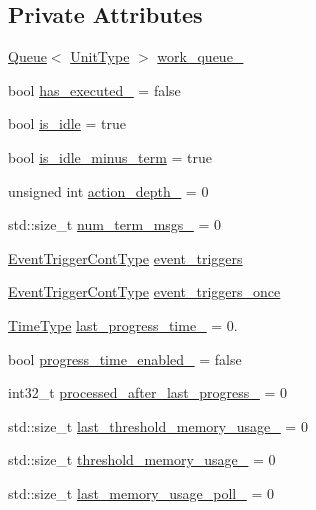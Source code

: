 \subsection*{Private Attributes}
\begin{DoxyCompactItemize}
\item 
\hyperlink{structvt_1_1sched_1_1_queue}{Queue}$<$ \hyperlink{structvt_1_1sched_1_1_scheduler_a398229f29b0940cea85aba4bae78b0be}{Unit\+Type} $>$ \hyperlink{structvt_1_1sched_1_1_scheduler_a8176bae441897c36b86e3fb917496a7a}{work\+\_\+queue\+\_\+}
\item 
bool \hyperlink{structvt_1_1sched_1_1_scheduler_ad67cd334d571ced5aa2ae2ffc6a8bec3}{has\+\_\+executed\+\_\+} = false
\item 
bool \hyperlink{structvt_1_1sched_1_1_scheduler_a99754f7b43db03bf0c67ae64d99c86ff}{is\+\_\+idle} = true
\item 
bool \hyperlink{structvt_1_1sched_1_1_scheduler_ad8e195a880684117d7cbb988488c36ef}{is\+\_\+idle\+\_\+minus\+\_\+term} = true
\item 
unsigned int \hyperlink{structvt_1_1sched_1_1_scheduler_a2cd57a3a421320e22d3ee8a6d47eb19e}{action\+\_\+depth\+\_\+} = 0
\item 
std\+::size\+\_\+t \hyperlink{structvt_1_1sched_1_1_scheduler_a4c70a87a9b15558a6ed628272a1db0fd}{num\+\_\+term\+\_\+msgs\+\_\+} = 0
\item 
\hyperlink{structvt_1_1sched_1_1_scheduler_a68203230dc48285d3d50bbb363ed267b}{Event\+Trigger\+Cont\+Type} \hyperlink{structvt_1_1sched_1_1_scheduler_a1f4ed72508099a9959a861f75e37f334}{event\+\_\+triggers}
\item 
\hyperlink{structvt_1_1sched_1_1_scheduler_a68203230dc48285d3d50bbb363ed267b}{Event\+Trigger\+Cont\+Type} \hyperlink{structvt_1_1sched_1_1_scheduler_a6bd19949bf8d905ea48f59ed544f6424}{event\+\_\+triggers\+\_\+once}
\item 
\hyperlink{namespacevt_a876a9d0cd5a952859c72de8a46881442}{Time\+Type} \hyperlink{structvt_1_1sched_1_1_scheduler_aba043e8bb57963e7a490376a06d0c96d}{last\+\_\+progress\+\_\+time\+\_\+} = 0.
\item 
bool \hyperlink{structvt_1_1sched_1_1_scheduler_a0eba67280dfcfb4d1e612e4cf15b8c4b}{progress\+\_\+time\+\_\+enabled\+\_\+} = false
\item 
int32\+\_\+t \hyperlink{structvt_1_1sched_1_1_scheduler_a826e82af9529a9f2dd087e4b8c14be9d}{processed\+\_\+after\+\_\+last\+\_\+progress\+\_\+} = 0
\item 
std\+::size\+\_\+t \hyperlink{structvt_1_1sched_1_1_scheduler_a49a7b0137e9096d9197d8a664eb28bf2}{last\+\_\+threshold\+\_\+memory\+\_\+usage\+\_\+} = 0
\item 
std\+::size\+\_\+t \hyperlink{structvt_1_1sched_1_1_scheduler_a034c9560a2d4d8f60b3ddab063abe16d}{threshold\+\_\+memory\+\_\+usage\+\_\+} = 0
\item 
std\+::size\+\_\+t \hyperlink{structvt_1_1sched_1_1_scheduler_a54f31a009c8abdf8b9f220832b25f668}{last\+\_\+memory\+\_\+usage\+\_\+poll\+\_\+} = 0
\end{DoxyCompactItemize}
